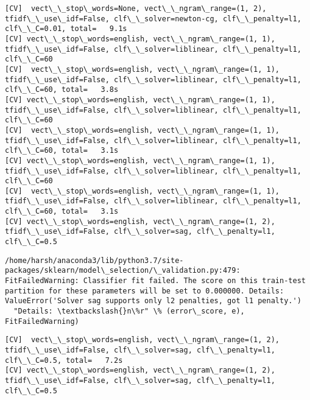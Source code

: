 \documentclass[11pt]{article}
\begin{document}
    \begin{Verbatim}[commandchars=\\\{\}]
[CV]  vect\_\_stop\_words=None, vect\_\_ngram\_range=(1, 2), tfidf\_\_use\_idf=False, clf\_\_solver=newton-cg, clf\_\_penalty=l1, clf\_\_C=0.01, total=   9.1s
[CV] vect\_\_stop\_words=english, vect\_\_ngram\_range=(1, 1), tfidf\_\_use\_idf=False, clf\_\_solver=liblinear, clf\_\_penalty=l1, clf\_\_C=60 
[CV]  vect\_\_stop\_words=english, vect\_\_ngram\_range=(1, 1), tfidf\_\_use\_idf=False, clf\_\_solver=liblinear, clf\_\_penalty=l1, clf\_\_C=60, total=   3.8s
[CV] vect\_\_stop\_words=english, vect\_\_ngram\_range=(1, 1), tfidf\_\_use\_idf=False, clf\_\_solver=liblinear, clf\_\_penalty=l1, clf\_\_C=60 
[CV]  vect\_\_stop\_words=english, vect\_\_ngram\_range=(1, 1), tfidf\_\_use\_idf=False, clf\_\_solver=liblinear, clf\_\_penalty=l1, clf\_\_C=60, total=   3.1s
[CV] vect\_\_stop\_words=english, vect\_\_ngram\_range=(1, 1), tfidf\_\_use\_idf=False, clf\_\_solver=liblinear, clf\_\_penalty=l1, clf\_\_C=60 
[CV]  vect\_\_stop\_words=english, vect\_\_ngram\_range=(1, 1), tfidf\_\_use\_idf=False, clf\_\_solver=liblinear, clf\_\_penalty=l1, clf\_\_C=60, total=   3.1s
[CV] vect\_\_stop\_words=english, vect\_\_ngram\_range=(1, 2), tfidf\_\_use\_idf=False, clf\_\_solver=sag, clf\_\_penalty=l1, clf\_\_C=0.5 

    \end{Verbatim}

    \begin{Verbatim}[commandchars=\\\{\}]
/home/harsh/anaconda3/lib/python3.7/site-packages/sklearn/model\_selection/\_validation.py:479: FitFailedWarning: Classifier fit failed. The score on this train-test partition for these parameters will be set to 0.000000. Details: 
ValueError('Solver sag supports only l2 penalties, got l1 penalty.')
  "Details: \textbackslash{}n\%r" \% (error\_score, e), FitFailedWarning)

    \end{Verbatim}

    \begin{Verbatim}[commandchars=\\\{\}]
[CV]  vect\_\_stop\_words=english, vect\_\_ngram\_range=(1, 2), tfidf\_\_use\_idf=False, clf\_\_solver=sag, clf\_\_penalty=l1, clf\_\_C=0.5, total=   7.2s
[CV] vect\_\_stop\_words=english, vect\_\_ngram\_range=(1, 2), tfidf\_\_use\_idf=False, clf\_\_solver=sag, clf\_\_penalty=l1, clf\_\_C=0.5 

    \end{Verbatim}
\end{document}
